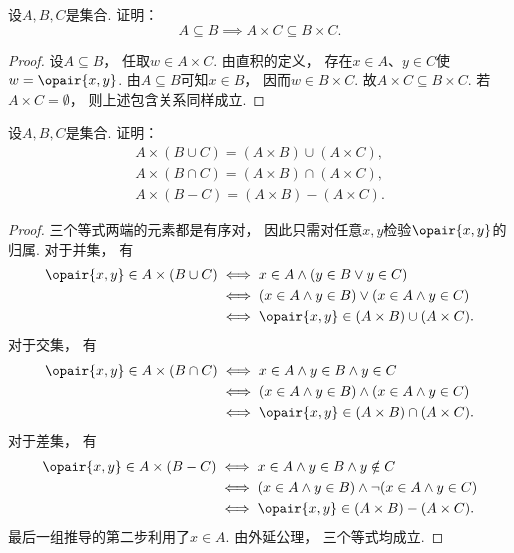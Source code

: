 \begin{example}
    设\(A,B,C\)是集合.
    证明：
    \begin{equation}
        A \subseteq B
        \implies
        A \times C \subseteq B \times C.
    \end{equation}
    \begin{proof}
        设\(A\subseteq B\)，
        任取\(w\in A\times C\).
        由直积的定义，
        存在\(x\in A\)、\(y\in C\)使\(w=\opair{x,y}\).
        由\(A\subseteq B\)可知\(x\in B\)，
        因而\(w\in B\times C\).
        故\(A\times C\subseteq B\times C\).
        若\(A\times C=\emptyset\)，
        则上述包含关系同样成立.
    \end{proof}
\end{example}

\begin{example}
    设\(A,B,C\)是集合.
    证明：
    \begin{gather}
        A \times (B \cup C) = (A \times B) \cup (A \times C),
        \label{equation:集合论.直积分配律1} \\
        A \times (B \cap C) = (A \times B) \cap (A \times C),
        \label{equation:集合论.直积分配律2} \\
        A \times (B - C) = (A \times B) - (A \times C).
        \label{equation:集合论.直积分配律3}
    \end{gather}
    \begin{proof}
        三个等式两端的元素都是有序对，
        因此只需对任意\(x,y\)检验\(\opair{x,y}\)的归属.
        对于并集，
        有
        \begin{align*}
            \opair{x,y}\in A\times(B\cup C)
            &\iff x\in A\land(y\in B\lor y\in C) \\
            &\iff (x\in A\land y\in B)\lor(x\in A\land y\in C) \\
            &\iff\opair{x,y}\in(A\times B)\cup(A\times C).
        \end{align*}
        对于交集，
        有
        \begin{align*}
            \opair{x,y}\in A\times(B\cap C)
            &\iff x\in A\land y\in B\land y\in C \\
            &\iff (x\in A\land y\in B)\land(x\in A\land y\in C) \\
            &\iff\opair{x,y}\in(A\times B)\cap(A\times C).
        \end{align*}
        对于差集，
        有
        \begin{align*}
            \opair{x,y}\in A\times(B-C)
            &\iff x\in A\land y\in B\land y\notin C \\
            &\iff (x\in A\land y\in B)\land\neg(x\in A\land y\in C) \\
            &\iff\opair{x,y}\in(A\times B)-(A\times C).
        \end{align*}
        最后一组推导的第二步利用了\(x\in A\).
        由外延公理，
        三个等式均成立.
    \end{proof}
\end{example}

